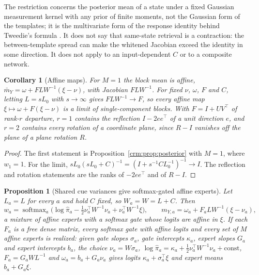 \documentclass[11pt]{article}
\newtheorem{proposition}[theorem]{Proposition}
\newtheorem{corollary}[theorem]{Corollary}
\theoremstyle{definition}
\theoremstyle{remark}
\newcommand{\softmax}{\operatorname{softmax}}
\newcommand{\pihat}{\hat\pi}
\begin{document}
The restriction concerns the posterior mean of a state under a fixed Gaussian measurement kernel with any prior of finite moments, not the Gaussian form of the templates; it is the multivariate form of the response identity behind Tweedie's formula \citep{Robbins1956Empirical,Efron2011Tweedie}. It does not say that same-state retrieval is a contraction: the between-template spread can make the whitened Jacobian exceed the identity in some direction. It does not apply to an input-dependent $C$ or to a composite network.

\begin{corollary}[Affine maps]
\label{crm:cor:affine}
For $M=1$ the block mean is affine, $\bar m_Y=\omega+FL W^{-1}(\xi-\nu)$, with Jacobian $FLW^{-1}$. For fixed $\nu$, $\omega$, $F$ and $C$, letting $L=sL_0$ with $s\to\infty$ gives $FLW^{-1}\to F$, so every affine map $\xi\mapsto\omega+F(\xi-\nu)$ is a limit of single-component blocks. With $F=I+UV^\top$ of rank-$r$ departure, $r=1$ contains the reflection $I-2ee^\top$ of a unit direction $e$, and $r=2$ contains every rotation of a coordinate plane, since $R-I$ vanishes off the plane of a plane rotation $R$.
\end{corollary}

\begin{proof}
The first statement is Proposition~\ref{crm:prop:posterior} with $M=1$, where $w_1=1$. For the limit, $sL_0(sL_0+C)^{-1}=(I+s^{-1}CL_0^{-1})^{-1}\to I$. The reflection and rotation statements are the ranks of $-2ee^\top$ and of $R-I$.
\end{proof}

\begin{proposition}[Shared cue variances give softmax-gated affine experts]
\label{crm:prop:moe}
Let $L_a=L$ for every $a$ and hold $C$ fixed, so $W_a=W=L+C$. Then
\begin{equation}
w_a=\softmax_a\bigl(\log\pihat_a-\tfrac12\nu_a^\top W^{-1}\nu_a+\nu_a^\top W^{-1}\xi\bigr),\qquad
m_{Y,a}=\omega_a+F_aLW^{-1}(\xi-\nu_a),
\label{crm:eq:moe}
\end{equation}
a mixture of affine experts with a softmax gate whose logits are affine in $\xi$. If each $F_a$ is a free dense matrix, every softmax gate with affine logits and every set of $M$ affine experts is realized: given gate slopes $\sigma_a$, gate intercepts $\kappa_a$, expert slopes $G_a$ and expert intercepts $b_a$, the choice $\nu_a=W\sigma_a$, $\log\pihat_a=\kappa_a+\tfrac12\nu_a^\top W^{-1}\nu_a+\mathrm{const}$, $F_a=G_aWL^{-1}$ and $\omega_a=b_a+G_a\nu_a$ gives logits $\kappa_a+\sigma_a^\top\xi$ and expert means $b_a+G_a\xi$.
\end{proposition}
\end{document}

